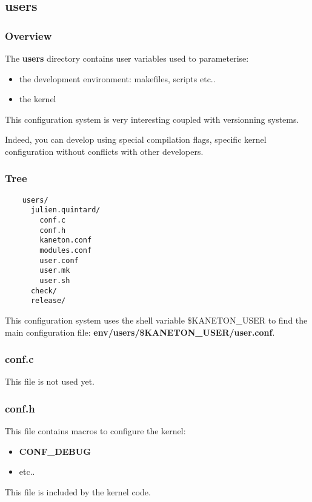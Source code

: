 %
%

\subsection{users}


\begin{frame}
  \frametitle{Overview}

  The \textbf{users} directory contains user variables used to parameterise:

  \begin{itemize}
    \item
      the development environment: makefiles, scripts etc..
    \item
      the kernel
  \end{itemize}

  \nl

  This configuration system is very interesting coupled with versionning
  systems.

  \nl

  Indeed, you can develop using special compilation flags, specific kernel
  configuration without conflicts with other developers.
\end{frame}


\begin{frame}[containsverbatim]
  \frametitle{Tree}

  \begin{verbatim}
    users/
      julien.quintard/
        conf.c
        conf.h
        kaneton.conf
        modules.conf
        user.conf
        user.mk
        user.sh
      check/
      release/
  \end{verbatim}

  This configuration system uses the shell variable \$KANETON\_USER to find
  the main configuration file: \textbf{env/users/\$KANETON\_USER/user.conf}.
\end{frame}


\begin{frame}
  \frametitle{conf.c}

  This file is not used yet.
\end{frame}


\begin{frame}
  \frametitle{conf.h}

  This file contains macros to configure the kernel:

  \begin{itemize}
    \item
      \textbf{CONF\_DEBUG}
    \item
      etc..
  \end{itemize}

  \nl

  This file is included by the kernel code.
\end{frame}

